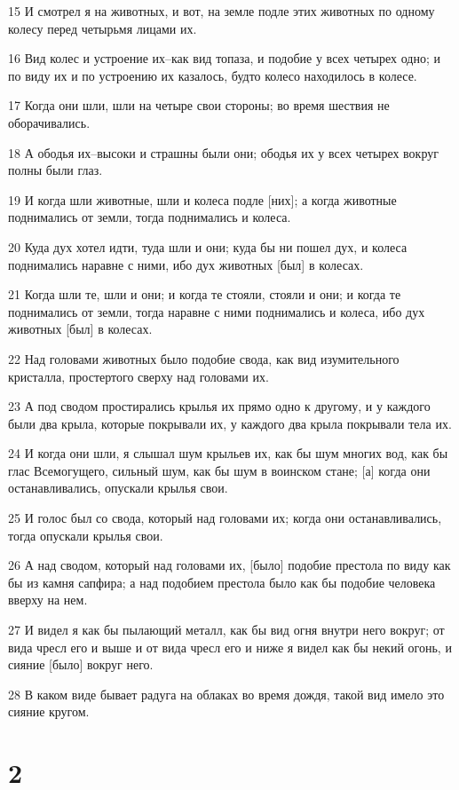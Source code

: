 \par 15 И смотрел я на животных, и вот, на земле подле этих животных по одному колесу перед четырьмя лицами их.
\par 16 Вид колес и устроение их--как вид топаза, и подобие у всех четырех одно; и по виду их и по устроению их казалось, будто колесо находилось в колесе.
\par 17 Когда они шли, шли на четыре свои стороны; во время шествия не оборачивались.
\par 18 А ободья их--высоки и страшны были они; ободья их у всех четырех вокруг полны были глаз.
\par 19 И когда шли животные, шли и колеса подле [них]; а когда животные поднимались от земли, тогда поднимались и колеса.
\par 20 Куда дух хотел идти, туда шли и они; куда бы ни пошел дух, и колеса поднимались наравне с ними, ибо дух животных [был] в колесах.
\par 21 Когда шли те, шли и они; и когда те стояли, стояли и они; и когда те поднимались от земли, тогда наравне с ними поднимались и колеса, ибо дух животных [был] в колесах.
\par 22 Над головами животных было подобие свода, как вид изумительного кристалла, простертого сверху над головами их.
\par 23 А под сводом простирались крылья их прямо одно к другому, и у каждого были два крыла, которые покрывали их, у каждого два крыла покрывали тела их.
\par 24 И когда они шли, я слышал шум крыльев их, как бы шум многих вод, как бы глас Всемогущего, сильный шум, как бы шум в воинском стане; [а] когда они останавливались, опускали крылья свои.
\par 25 И голос был со свода, который над головами их; когда они останавливались, тогда опускали крылья свои.
\par 26 А над сводом, который над головами их, [было] подобие престола по виду как бы из камня сапфира; а над подобием престола было как бы подобие человека вверху на нем.
\par 27 И видел я как бы пылающий металл, как бы вид огня внутри него вокруг; от вида чресл его и выше и от вида чресл его и ниже я видел как бы некий огонь, и сияние [было] вокруг него.
\par 28 В каком виде бывает радуга на облаках во время дождя, такой вид имело это сияние кругом.

\chapter{2}

